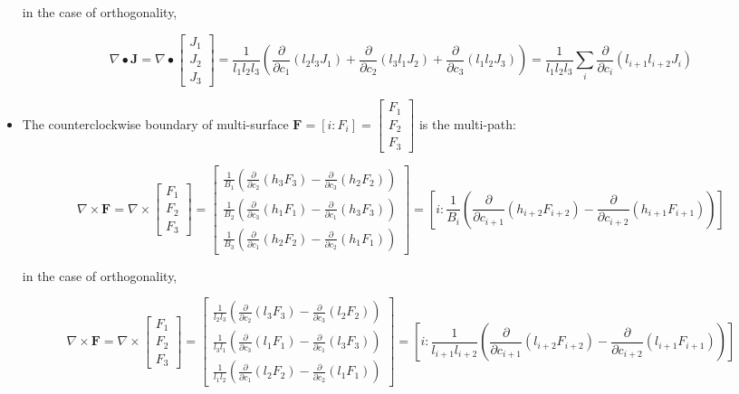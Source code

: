 \begin{itemize}
in the case of orthogonality, 

\[\nabla \bullet \mathbf{J} = \nabla \bullet \begin{bmatrix} J_1 \\ J_2 \\ J_3 \end{bmatrix} = \frac{1}{l_1 l_2 l_3}\left(\frac{\partial}{\partial c_1}(l_2 l_3 J_1) + \frac{\partial}{\partial c_2}(l_3 l_1 J_2) + \frac{\partial}{\partial c_3}(l_1 l_2 J_3)\right) = \frac{1}{l_1 l_2 l_3}\sum_i \frac{\partial}{\partial c_i} (l_{i+1} l_{i+2} J_i)\]


\item The counterclockwise boundary of multi-surface \(\mathbf{F} = [i : F_i] = \begin{bmatrix} F_1 \\ F_2 \\ F_3 \end{bmatrix}\) is the multi-path:

\[\nabla \times \mathbf{F} = \nabla \times \begin{bmatrix} F_1 \\ F_2 \\ F_3 \end{bmatrix} = \begin{bmatrix} \frac{1}{B_1}\left(\frac{\partial}{\partial c_2}(h_3 F_3) - \frac{\partial}{\partial c_3}(h_2 F_2)\right) \\ \frac{1}{B_2}\left(\frac{\partial}{\partial c_3}(h_1 F_1) - \frac{\partial}{\partial c_1}(h_3 F_3)\right) \\ \frac{1}{B_3}\left(\frac{\partial}{\partial c_1}(h_2 F_2) - \frac{\partial}{\partial c_2}(h_1 F_1)\right) \end{bmatrix} = \left[ i : \frac{1}{B_i}\left(\frac{\partial}{\partial c_{i+1}}(h_{i+2} F_{i+2}) - \frac{\partial}{\partial c_{i+2}}(h_{i+1} F_{i+1})\right) \right]\]

in the case of orthogonality, 

\[\nabla \times \mathbf{F} = \nabla \times \begin{bmatrix} F_1 \\ F_2 \\ F_3 \end{bmatrix} = \begin{bmatrix} \frac{1}{l_2 l_3}\left(\frac{\partial}{\partial c_2}(l_3 F_3) - \frac{\partial}{\partial c_3}(l_2 F_2)\right) \\ \frac{1}{l_3 l_1}\left(\frac{\partial}{\partial c_3}(l_1 F_1) - \frac{\partial}{\partial c_1}(l_3 F_3)\right) \\ \frac{1}{l_1 l_2}\left(\frac{\partial}{\partial c_1}(l_2 F_2) - \frac{\partial}{\partial c_2}(l_1 F_1)\right) \end{bmatrix} = \left[ i : \frac{1}{l_{i+1} l_{i+2}}\left(\frac{\partial}{\partial c_{i+1}}(l_{i+2} F_{i+2}) - \frac{\partial}{\partial c_{i+2}}(l_{i+1} F_{i+1})\right) \right]\]


\end{itemize}
